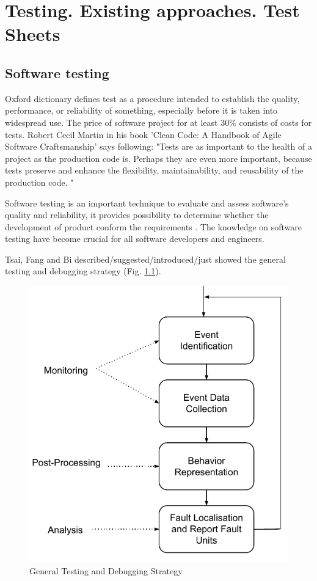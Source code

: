 \chapter{Testing. Existing approaches. Test Sheets}
\section{Software testing}
Oxford dictionary defines test as a procedure intended to establish the quality, performance, or reliability of something, especially before it is taken into widespread use. 
The price of software project for at least 30\% consists of costs for tests\cite{Lecture2}.
Robert Cecil Martin in his book 'Clean Code: A Handbook of Agile Software Craftsmanship'\cite{MartinClean} says following: "Tests are as important to the health of a project as the production code is. 
Perhaps they are even more important, because tests preserve and enhance the flexibility, maintainability, and reusability of the production code. "

Software testing is an important technique to evaluate and assess software's quality and reliability\cite{cota}, it provides possibility to determine whether the development of product conform the requirements \cite{ieeeTesting}.
The knowledge on software testing have become crucial for all software developers and engineers\cite{IntroductionST}.

Tsai, Fang and Bi described/suggested/introduced/just showed the general testing and debugging strategy (Fig. \ref{fig:GeneralTestingAndDebugging}).

\begin{figure}[ht]
	\centering
	\includegraphics[width=0.7\linewidth]{grafiken/GeneralTestingAndDebugging}
	\caption{}
	\label{fig:GeneralTestingAndDebugging}
	\caption{General Testing and Debugging Strategy\cite{rtSandD}}
\end{figure}

